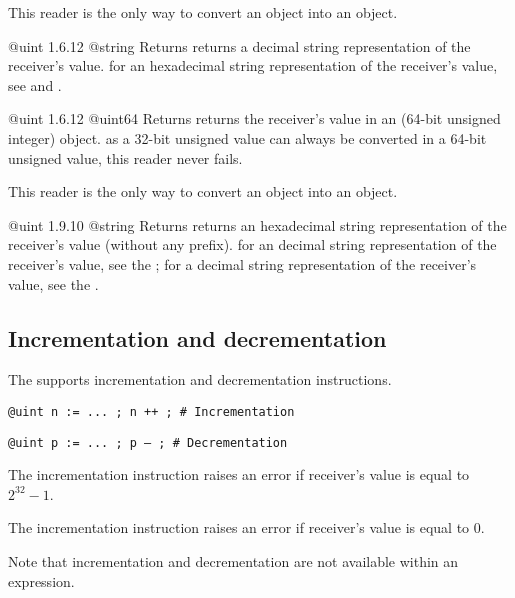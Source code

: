 This reader is the only way to convert an  object into an  object.


{@uint}
{1.6.12}
{@string}
{Returns returns a decimal string representation of the receiver's value.}
{for an hexadecimal string representation of the receiver's value, see  and .}




{@uint}
{1.6.12}
{@uint64}
{Returns returns the receiver's value in an  (64-bit unsigned integer) object.}
{as a 32-bit unsigned value can always be converted in a 64-bit unsigned value, this reader never fails.}

This reader is the only way to convert an  object into an  object.




{@uint}
{1.9.10}
{@string}
{Returns returns an hexadecimal string representation of the receiver's value (without any prefix).}
{for an decimal string representation of the receiver's value, see the ; for a decimal string representation of the receiver's value, see the .}






\subsection{Incrementation and decrementation}

The  supports incrementation and decrementation instructions.

\texttt{@uint n := ... ; n ++ ; \# Incrementation}

\texttt{@uint p := ... ; p -- ; \# Decrementation}\newline

The incrementation instruction raises an error if receiver's value is equal to $2^{32}-1$.\newline

The incrementation instruction raises an error if receiver's value is equal to 0.\newline

Note that incrementation and decrementation are not available within an expression.




